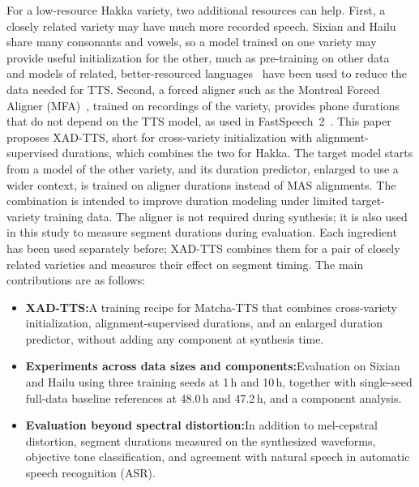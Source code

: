 \documentclass[conference,a4paper]{IEEEtran}
\begin{document}
For a low-resource Hakka variety, two additional resources can help. First, a closely related variety may have much more recorded speech. Sixian and Hailu share many consonants and vowels, so a model trained on one variety may provide useful initialization for the other, much as pre-training on other data~\cite{chung2019semi} and models of related, better-resourced languages~\cite{chen2019crosslingual,xu2020lrspeech} have been used to reduce the data needed for TTS. Second, a forced aligner such as the Montreal Forced Aligner (MFA)~\cite{mcauliffe2017mfa}, trained on recordings of the variety, provides phone durations that do not depend on the TTS model, as used in FastSpeech~2~\cite{ren2021fastspeech2}. This paper proposes XAD-TTS, short for cross-variety initialization with alignment-supervised durations, which combines the two for Hakka. The target model starts from a model of the other variety, and its duration predictor, enlarged to use a wider context, is trained on aligner durations instead of MAS alignments. The combination is intended to improve duration modeling under limited target-variety training data. The aligner is not required during synthesis; it is also used in this study to measure segment durations during evaluation. Each ingredient has been used separately before; XAD-TTS combines them for a pair of closely related varieties and measures their effect on segment timing. The main contributions are as follows:
\begin{itemize}[leftmargin=*, labelindent=0pt, itemsep=0pt]
\item \textbf{XAD-TTS:}\newline A training recipe for Matcha-TTS that combines cross-variety initialization, alignment-supervised durations, and an enlarged duration predictor, without adding any component at synthesis time.
\item \textbf{Experiments across data sizes and components:}\newline Evaluation on Sixian and Hailu using three training seeds at 1\,h and 10\,h, together with single-seed full-data baseline references at 48.0\,h and 47.2\,h, and a component analysis.
\item \textbf{Evaluation beyond spectral distortion:}\newline In addition to mel-cepstral distortion, segment durations measured on the synthesized waveforms, objective tone classification, and agreement with natural speech in automatic speech recognition (ASR).
\end{itemize}
\end{document}
